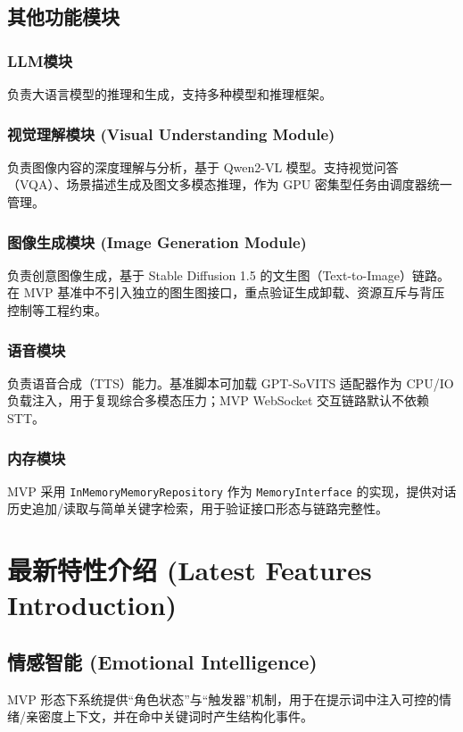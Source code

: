 \documentclass[a4paper,12pt]{article}
\begin{document}
\subsection{其他功能模块}

\subsubsection{LLM模块}
负责大语言模型的推理和生成，支持多种模型和推理框架。

\subsubsection{视觉理解模块 (Visual Understanding Module)}
负责图像内容的深度理解与分析，基于 Qwen2-VL 模型。支持视觉问答（VQA）、场景描述生成及图文多模态推理，作为 GPU 密集型任务由调度器统一管理。

\subsubsection{图像生成模块 (Image Generation Module)}
负责创意图像生成，基于 Stable Diffusion 1.5 的文生图（Text-to-Image）链路。在 MVP 基准中不引入独立的图生图接口，重点验证生成卸载、资源互斥与背压控制等工程约束。

\subsubsection{语音模块}
负责语音合成（TTS）能力。基准脚本可加载 GPT-SoVITS 适配器作为 CPU/IO 负载注入，用于复现综合多模态压力；MVP WebSocket 交互链路默认不依赖 STT。

\subsubsection{内存模块}
MVP 采用 \texttt{InMemoryMemoryRepository} 作为 \texttt{MemoryInterface} 的实现，提供对话历史追加/读取与简单关键字检索，用于验证接口形态与链路完整性。

\section{最新特性介绍 (Latest Features Introduction)}

\subsection{情感智能 (Emotional Intelligence)}

MVP 形态下系统提供“角色状态”与“触发器”机制，用于在提示词中注入可控的情绪/亲密度上下文，并在命中关键词时产生结构化事件。
\end{document}
